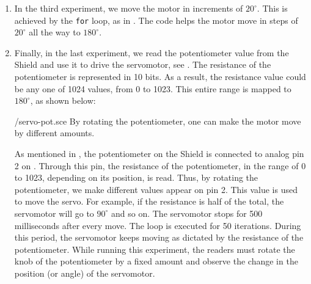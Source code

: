 \begin{enumerate}
        
        
  \item In the third experiment, we move the motor in increments of
        $20^\circ$.  This is achieved by the {\tt for} loop, as in
        . The code helps the motor move in steps of $20^\circ$ all
        the way to $180^\circ$.  
        
  \item Finally, in the last experiment, we read the potentiometer value
        from the Shield and use it to drive the servomotor, see
        .  The resistance of the potentiometer is
        represented in 10 bits.  As a result, the resistance value could be
        any one of 1024 values, from 0 to 1023.  This entire range is
        mapped to $180^\circ$, as shown below:
        
        {\LocSERscicode/servo-pot.sce}
        By rotating the potentiometer, one can make
        the motor move by different amounts.
        
        As mentioned in , the potentiometer on the Shield is connected 
        to analog pin 2 on \arduino. Through this pin, the resistance of the potentiometer, in the range of 0 to 1023,
        depending on its position, is read.  Thus, by rotating the
        potentiometer, we make different values appear on pin 2.  This value
        is used to move the servo.  For example, if the resistance is half
        of the total, the servomotor will go to $90^\circ$ and so on.  The
        servomotor stops for 500 milliseconds after every move.  The loop is
        executed for 50 iterations. During this period, the servomotor keeps moving as dictated by the
        resistance of the potentiometer. While running this experiment, the readers 
        must rotate the knob of the potentiometer by a fixed amount and observe 
        the change in the position (or angle) of the servomotor.   
        
        
        

\end{enumerate}
